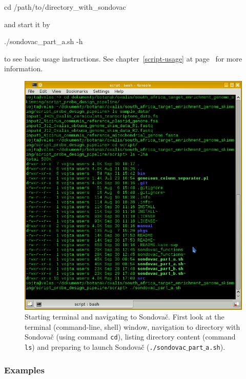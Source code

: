 \documentclass[a4paper, 11pt, twoside]{article}
\begin{document}
\begin{bashcode}
  cd /path/to/directory_with_sondovac
\end{bashcode}

and start it by

\begin{bashcode}
  ./sondovac_part_a.sh -h
\end{bashcode}

to see basic usage instructions. See chapter~\ref{script-usage} at page~\pageref{script-usage} for more information.

\begin{figure}[htbp]
\includegraphics[width=\textwidth]{terminal.png}
\caption[Starting terminal and navigating to Sondovač]{Starting terminal and navigating to Sondovač. First look at the terminal (command-line, shell) window, navigation to directory with Sondovač (using command \texttt{cd}), listing directory content (command \texttt{ls}) and preparing to launch Sondovač (\texttt{./sondovac$\_$part$\_$a.sh}).}
\label{terminal}
\end{figure}

\subsubsection{Examples}
\end{document}
